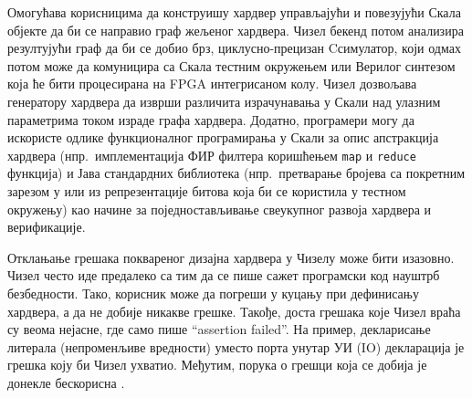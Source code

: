 \documentclass[12pt, a4paper]{article}
\def\CC{{C\nolinebreak[4]\hspace{-.05em}\raisebox{.4ex}{\tiny\bf ++}}}
\theoremstyle{definition}
\begin{document}
Омогућава корисницима да конструишу хардвер управљајући и повезујући Скала објекте да би се направио граф жељеног хардвера. Чизел бекенд потом анализира резултујући граф да би се добио брз,
циклусно-прецизан \CC\phantom{a}симулатор, који одмах потом може да комуницира са Скала тестним окружењем или Верилог синтезом која ће бити процесирана на FPGA интегрисаном колу. Чизел дозвољава генератору хардвера да изврши различита израчунавања у Скали над улазним параметрима током израде графа хардвера. Додатно, програмери могу да искористе одлике функционалног програмирања у Скали за опис апстракција хардвера (нпр.\ имплементација ФИР филтера коришћењем \verb+map+ и \verb+reduce+ функција) и Јава стандардних библиотека (нпр.\ претварање бројева са покретним зарезом у или из репрезентације битова која би се користила у тестном окружењу) као начине за поједностављивање свеукупног развоја хардвера и верификације.
%

Отклањање грешака поквареног дизајна хардвера у Чизелу може бити изазовно. Чизел често иде предалеко са тим да се пише сажет програмски код науштрб безбедности. Тако, корисник може да погреши у куцању при дефинисању хардвера, а да не добије никакве грешке. Такође, доста грешака које Чизел враћа су веома нејасне, где само пише ``assertion failed''. На пример, декларисање литерала (непроменљиве вредности) уместо порта унутар УИ (IO) декларација је грешка коју би Чизел ухватио. Међутим, порука о грешци која се добија је донекле бескорисна \cite{berkeley_twigg}.
\end{document}
